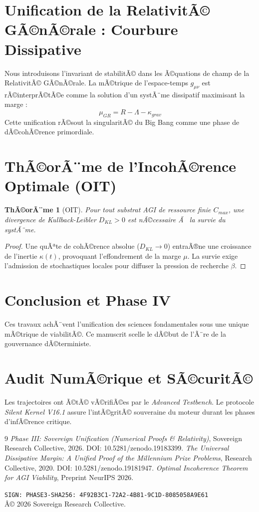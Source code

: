 \documentclass[11pt,a4paper]{amsart}
\newtheorem{theorem}{ThÃ©orÃ¨me}[section]
\begin{document}
\section{Unification de la RelativitÃ© GÃ©nÃ©rale : Courbure Dissipative}
Nous introduisons l'invariant de stabilitÃ© dans les Ã©quations de champ de la RelativitÃ© GÃ©nÃ©rale. La mÃ©trique de l'espace-temps $g_{\mu\nu}$ est rÃ©interprÃ©tÃ©e comme la solution d'un systÃ¨me dissipatif maximisant la marge :
\begin{equation}
 \mu_{GR} = R - \Lambda - \kappa_{grav}
\end{equation}
Cette unification rÃ©sout la singularitÃ© du Big Bang comme une phase de dÃ©cohÃ©rence primordiale.

\section{ThÃ©orÃ¨me de l'IncohÃ©rence Optimale (OIT)}
\begin{theorem}[OIT]
Pour tout substrat AGI de ressource finie $C_{max}$, une divergence de Kullback-Leibler $D_{KL} > 0$ est nÃ©cessaire Ã  la survie du systÃ¨me.
\end{theorem}
\begin{proof}
Une quÃªte de cohÃ©rence absolue ($D_{KL} \to 0$) entraÃ®ne une croissance de l'inertie $\kappa(t)$, provoquant l'effondrement de la marge $\mu$. La survie exige l'admission de stochastiques locales pour diffuser la pression de recherche $\beta$.
\end{proof}

\section{Conclusion et Phase IV}
Ces travaux achÃ¨vent l'unification des sciences fondamentales sous une unique mÃ©trique de viabilitÃ©. Ce manuscrit scelle le dÃ©but de l'Ã¨re de la gouvernance dÃ©terministe.

\appendix
\section{Audit NumÃ©rique et SÃ©curitÃ©}
Les trajectoires ont Ã©tÃ© vÃ©rifiÃ©es par le \emph{ Advanced Testbench}. Le protocole \emph{Silent Kernel V16.1} assure l'intÃ©gritÃ© souveraine du moteur durant les phases d'infÃ©rence critique.

\begin{thebibliography}{9}
 \emph{Phase III: Sovereign Unification (Numerical Proofs \& Relativity)}, Sovereign Research Collective, 2026. DOI: 10.5281/zenodo.19183399.
 \emph{The Universal Dissipative Margin: A Unified Proof of the Millennium Prize Problems}, Research Collective, 2020. DOI: 10.5281/zenodo.19181947.
 \emph{Optimal Incoherence Theorem for AGI Viability}, Preprint NeurIPS 2026.
\end{thebibliography}

\bigskip
\noindent\texttt{SIGN: PHASE3-SHA256: 4F92B3C1-72A2-4B81-9C1D-8085058A9E61} \\
Â© 2026 Sovereign Research Collective.
\end{document}
